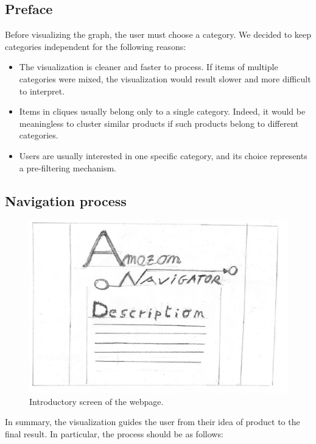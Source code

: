 \documentclass[a4paper,12pt]{article}
\begin{document}
\subsection{Preface}
Before visualizing the graph, the user must choose a category.
We decided to keep categories independent for the following reasons:
\begin{itemize}
	\item The visualization is cleaner and faster to process. If items of multiple categories were mixed, the visualization would result slower and more difficult to interpret.
	\item Items in cliques usually belong only to a single category. Indeed, it would be meaningless to cluster similar products if such products belong to different categories.
	\item Users are usually interested in one specific category, and its choice represents a pre-filtering mechanism.
\end{itemize}

\subsection{Navigation process}

\begin{figure}[H]
	\centering{}
	\includegraphics[width=\textwidth]{img/amazon.png}
	\caption{Introductory screen of the webpage.}
	\label{fig:amazon}
\end{figure}
In summary, the visualization guides the user from their idea of product to the final result. In particular, the process should be as follows:
\end{document}

